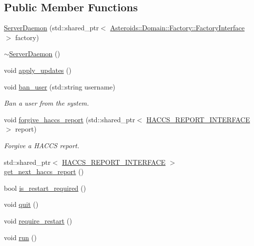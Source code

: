 \subsection*{Public Member Functions}
\begin{DoxyCompactItemize}
\item 
\hyperlink{classAsteroids_1_1Domain_1_1Server_1_1ServerDaemon_adb13a988eee60960a1994277ef35de7c}{Server\+Daemon} (std\+::shared\+\_\+ptr$<$ \hyperlink{classAsteroids_1_1Domain_1_1Factory_1_1FactoryInterface}{Asteroids\+::\+Domain\+::\+Factory\+::\+Factory\+Interface} $>$ factory)
\item 
\hyperlink{classAsteroids_1_1Domain_1_1Server_1_1ServerDaemon_a21be1fef2658af9fa55a8353ac12c217}{$\sim$\+Server\+Daemon} ()
\item 
void \hyperlink{classAsteroids_1_1Domain_1_1Server_1_1ServerDaemon_ad5e5e845e150a331cdb6703d8b8ba94f}{apply\+\_\+updates} ()
\item 
void \hyperlink{classAsteroids_1_1Domain_1_1Server_1_1ServerDaemon_a16123054c6978205c98ffeb122894606}{ban\+\_\+user} (std\+::string username)
\begin{DoxyCompactList}\small\item\em Ban a user from the system. \end{DoxyCompactList}\item 
void \hyperlink{classAsteroids_1_1Domain_1_1Server_1_1ServerDaemon_a0db3978640446e783c54932014d043cb}{forgive\+\_\+haccs\+\_\+report} (std\+::shared\+\_\+ptr$<$ \hyperlink{classAsteroids_1_1Domain_1_1Server_1_1HACCS__REPORT__INTERFACE}{H\+A\+C\+C\+S\+\_\+\+R\+E\+P\+O\+R\+T\+\_\+\+I\+N\+T\+E\+R\+F\+A\+CE} $>$ report)
\begin{DoxyCompactList}\small\item\em Forgive a H\+A\+C\+CS report. \end{DoxyCompactList}\item 
std\+::shared\+\_\+ptr$<$ \hyperlink{classAsteroids_1_1Domain_1_1Server_1_1HACCS__REPORT__INTERFACE}{H\+A\+C\+C\+S\+\_\+\+R\+E\+P\+O\+R\+T\+\_\+\+I\+N\+T\+E\+R\+F\+A\+CE} $>$ \hyperlink{classAsteroids_1_1Domain_1_1Server_1_1ServerDaemon_a53548491d0700fffff3730f3c48525d6}{get\+\_\+next\+\_\+haccs\+\_\+report} ()
\item 
bool \hyperlink{classAsteroids_1_1Domain_1_1Server_1_1ServerDaemon_a3cafc61bfa34d7af93f6d50a36380da0}{is\+\_\+restart\+\_\+required} ()
\item 
void \hyperlink{classAsteroids_1_1Domain_1_1Server_1_1ServerDaemon_a92d9ded3d37ff875f13172b3b175d176}{quit} ()
\item 
void \hyperlink{classAsteroids_1_1Domain_1_1Server_1_1ServerDaemon_a11925ed5e5c6951aceac9c823789476e}{require\+\_\+restart} ()
\item 
void \hyperlink{classAsteroids_1_1Domain_1_1Server_1_1ServerDaemon_a3f49917f69b862fd6dc916ad15fa2f92}{run} ()
\end{DoxyCompactItemize}
